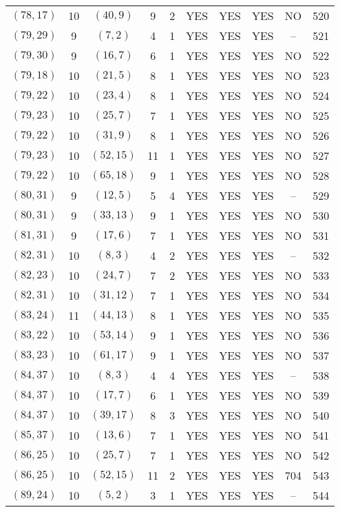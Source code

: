 \begin{longtable}{|c|c|c|c|c|c|c|c|c|c|}
$(78, 17)$ & 10 & $(40, 9)$ & 9 & 2 & YES & YES & YES & NO & 520\\
$(79, 29)$ & 9 & $(7, 2)$ & 4 & 1 & YES & YES & YES & -- & 521\\
$(79, 30)$ & 9 & $(16, 7)$ & 6 & 1 & YES & YES & YES & NO & 522\\
$(79, 18)$ & 10 & $(21, 5)$ & 8 & 1 & YES & YES & YES & NO & 523\\
$(79, 22)$ & 10 & $(23, 4)$ & 8 & 1 & YES & YES & YES & NO & 524\\
$(79, 23)$ & 10 & $(25, 7)$ & 7 & 1 & YES & YES & YES & NO & 525\\
$(79, 22)$ & 10 & $(31, 9)$ & 8 & 1 & YES & YES & YES & NO & 526\\
$(79, 23)$ & 10 & $(52, 15)$ & 11 & 1 & YES & YES & YES & NO & 527\\
$(79, 22)$ & 10 & $(65, 18)$ & 9 & 1 & YES & YES & YES & NO & 528\\
$(80, 31)$ & 9 & $(12, 5)$ & 5 & 4 & YES & YES & YES & -- & 529\\
$(80, 31)$ & 9 & $(33, 13)$ & 9 & 1 & YES & YES & YES & NO & 530\\
$(81, 31)$ & 9 & $(17, 6)$ & 7 & 1 & YES & YES & YES & NO & 531\\
$(82, 31)$ & 10 & $(8, 3)$ & 4 & 2 & YES & YES & YES & -- & 532\\
$(82, 23)$ & 10 & $(24, 7)$ & 7 & 2 & YES & YES & YES & NO & 533\\
$(82, 31)$ & 10 & $(31, 12)$ & 7 & 1 & YES & YES & YES & NO & 534\\
$(83, 24)$ & 11 & $(44, 13)$ & 8 & 1 & YES & YES & YES & NO & 535\\
$(83, 22)$ & 10 & $(53, 14)$ & 9 & 1 & YES & YES & YES & NO & 536\\
$(83, 23)$ & 10 & $(61, 17)$ & 9 & 1 & YES & YES & YES & NO & 537\\
$(84, 37)$ & 10 & $(8, 3)$ & 4 & 4 & YES & YES & YES & -- & 538\\
$(84, 37)$ & 10 & $(17, 7)$ & 6 & 1 & YES & YES & YES & NO & 539\\
$(84, 37)$ & 10 & $(39, 17)$ & 8 & 3 & YES & YES & YES & NO & 540\\
$(85, 37)$ & 10 & $(13, 6)$ & 7 & 1 & YES & YES & YES & NO & 541\\
$(86, 25)$ & 10 & $(25, 7)$ & 7 & 1 & YES & YES & YES & NO & 542\\
$(86, 25)$ & 10 & $(52, 15)$ & 11 & 2 & YES & YES & YES & 704 & 543\\
$(89, 24)$ & 10 & $(5, 2)$ & 3 & 1 & YES & YES & YES & -- & 544\\

\end{longtable}
